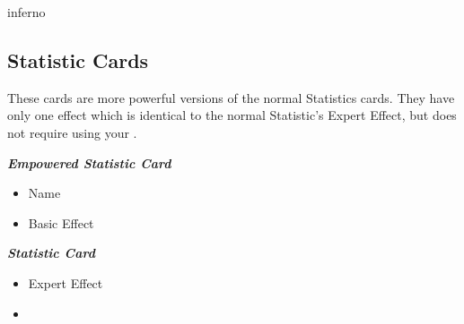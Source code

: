 \begin{multicols*}{2}
\columnbreak

\begin{expansion}[before=\vspace*{-11mm}]{inferno}
  \subsection*{ Statistic Cards}
  These cards are more powerful versions of the normal Statistics cards.
  They have only one effect which is identical to the normal Statistic's Expert Effect, but does not require using your .

  \bigskip
  \begin{scriptsize}
  \end{scriptsize}
  \vspace{-1em}
  \begin{multicols*}{2}
    \centering
    \footnotesize
    \textbf{\textit{\textcolor{darkcandyapplered}{Empowered Statistic Card}}}
    \vspace{1em}
    \begin{itemize}
      \item[\textbf{1.}] Name
      \item[\textbf{2.}] Basic Effect
    \end{itemize}
    \columnbreak
    \textbf{\textit{\textcolor{darkcandyapplered}{Statistic Card \phantom{Empowered}}}}
    \begin{itemize}
      \item[\textbf{3.}] Expert Effect
      \item[\textbf{\phantom{.}}] \phantom{.}
    \end{itemize}
  \end{multicols*}
\end{expansion}


\end{multicols*}
